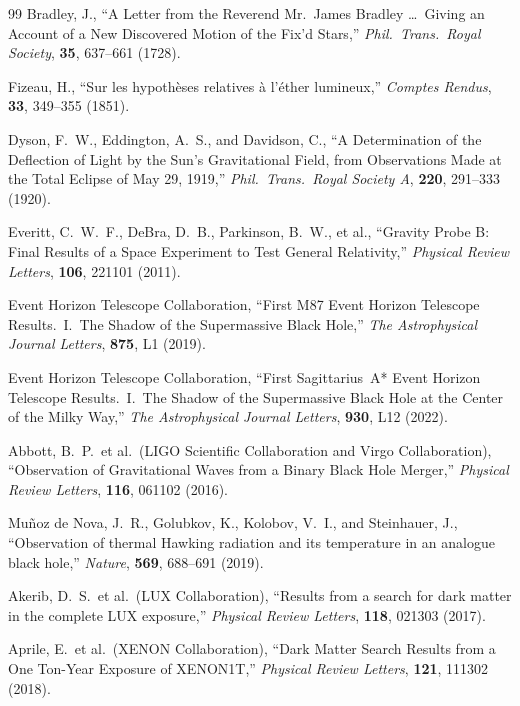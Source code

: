 \documentclass[12pt,letterpaper]{article}
\begin{document}
\begin{thebibliography}{99}
Bradley, J.,
``A Letter from the Reverend Mr.\ James Bradley \ldots\ Giving an Account of a New Discovered Motion of the Fix'd Stars,''
\textit{Phil.\ Trans.\ Royal Society}, \textbf{35}, 637--661 (1728).

Fizeau, H.,
``Sur les hypoth\`{e}ses relatives \`{a} l'\'{e}ther lumineux,''
\textit{Comptes Rendus}, \textbf{33}, 349--355 (1851).

Dyson, F.~W., Eddington, A.~S., and Davidson, C.,
``A Determination of the Deflection of Light by the Sun's Gravitational Field, from Observations Made at the Total Eclipse of May 29, 1919,''
\textit{Phil.\ Trans.\ Royal Society A}, \textbf{220}, 291--333 (1920).

Everitt, C.~W.~F., DeBra, D.~B., Parkinson, B.~W., et al.,
``Gravity Probe B: Final Results of a Space Experiment to Test General Relativity,''
\textit{Physical Review Letters}, \textbf{106}, 221101 (2011).

Event Horizon Telescope Collaboration,
``First M87 Event Horizon Telescope Results.\ I.\ The Shadow of the Supermassive Black Hole,''
\textit{The Astrophysical Journal Letters}, \textbf{875}, L1 (2019).

Event Horizon Telescope Collaboration,
``First Sagittarius~A* Event Horizon Telescope Results.\ I.\ The Shadow of the Supermassive Black Hole at the Center of the Milky Way,''
\textit{The Astrophysical Journal Letters}, \textbf{930}, L12 (2022).

Abbott, B.~P.\ et al.\ (LIGO Scientific Collaboration and Virgo Collaboration),
``Observation of Gravitational Waves from a Binary Black Hole Merger,''
\textit{Physical Review Letters}, \textbf{116}, 061102 (2016).

Mu\~{n}oz de Nova, J.~R., Golubkov, K., Kolobov, V.~I., and Steinhauer, J.,
``Observation of thermal Hawking radiation and its temperature in an analogue black hole,''
\textit{Nature}, \textbf{569}, 688--691 (2019).

Akerib, D.~S.\ et al.\ (LUX Collaboration),
``Results from a search for dark matter in the complete LUX exposure,''
\textit{Physical Review Letters}, \textbf{118}, 021303 (2017).

Aprile, E.\ et al.\ (XENON Collaboration),
``Dark Matter Search Results from a One Ton-Year Exposure of XENON1T,''
\textit{Physical Review Letters}, \textbf{121}, 111302 (2018).


\end{thebibliography}
\end{document}
